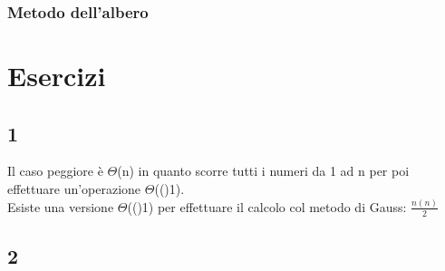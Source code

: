 \documentclass{report}
\newcommand{\T}[1]{$\Theta$(#1)}
\begin{document}
            \subsubsection{Metodo dell'albero}
            
\section{Esercizi}
    \subsection{1}
        Il caso peggiore è \T{n} in quanto scorre tutti i numeri da 1 ad n per poi effettuare 
        un'operazione \T(1). \\
        Esiste una versione \T(1) per effettuare il calcolo col metodo di Gauss: $\frac{n\left(n\right)}{2}$
    \subsection{2}
        
        
\end{document}
